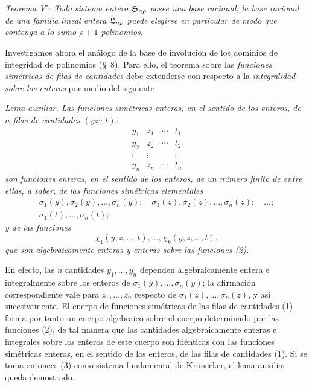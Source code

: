 \documentclass[11pt]{article}
\begin{document}
\emph{Teorema V$'$: Todo sistema entero $\mathfrak{S}_{n\rho}$ posee una base racional; la base racional de una familia lineal entera $\mathfrak{L}_{n\rho}$ puede elegirse en particular de modo que contenga a lo sumo $\rho+1$ polinomios.}

Investigamos ahora el análogo de la base de involución de los dominios de integridad de polinomios (\S\ 8). Para ello, el teorema sobre las \emph{funciones simétricas de filas de cantidades} debe extenderse con respecto a la \emph{integralidad sobre los enteros} por medio del siguiente

\emph{Lema auxiliar. Las funciones simétricas enteras, en el sentido de los enteros, de $n$ filas de cantidades $(yz\cdots t)$:}
\begin{equation}
\begin{array}{cccc}
  y_1&z_1&\cdots&t_1\\
  y_2&z_2&\cdots&t_2\\
  \vdots&\vdots&&\vdots\\
  y_n&z_n&\cdots&t_n
\end{array}
\tag{1}
\end{equation}
\emph{son funciones enteras, en el sentido de los enteros, de un número finito de entre ellas, a saber, de las funciones simétricas elementales}
\begin{equation}
\begin{gathered}
  \sigma_1(y),\sigma_2(y),\ldots,\sigma_n(y);\quad
  \sigma_1(z),\sigma_2(z),\ldots,\sigma_n(z);\quad\ldots;\\
  \sigma_1(t),\ldots,\sigma_n(t);
\end{gathered}
\tag{2}
\end{equation}
\emph{y de las funciones}
\begin{equation}
  \chi_1(y,z,\ldots,t),\ldots,\chi_k(y,z,\ldots,t),
\tag{3}
\end{equation}
\emph{que son algebraicamente enteras y enteras sobre las funciones (2).}

En efecto, las $n$ cantidades $y_1,\ldots,y_n$ dependen algebraicamente entera e integralmente sobre los enteros de $\sigma_1(y),\ldots,\sigma_n(y)$; la afirmación correspondiente vale para $z_1,\ldots,z_n$ respecto de $\sigma_1(z),\ldots,\sigma_n(z)$, y así sucesivamente. El cuerpo de funciones simétricas de las filas de cantidades (1) forma por tanto un cuerpo algebraico sobre el cuerpo determinado por las funciones (2), de tal manera que las cantidades algebraicamente enteras e integrales sobre los enteros de este cuerpo son idénticas con las funciones simétricas enteras, en el sentido de los enteros, de las filas de cantidades (1). Si se toma entonces (3) como sistema fundamental de Kronecker, el lema auxiliar queda demostrado.
\end{document}
